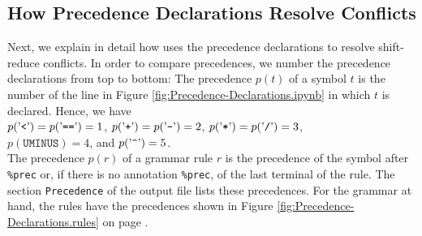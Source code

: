 \subsection{How Precedence Declarations Resolve Conflicts \label{section:resolving-with-precedences}}
Next, we explain in detail how  uses the precedence declarations to resolve shift-reduce
conflicts.  In order to compare precedences, we number the precedence declarations from top to bottom:  The
precedence $p(t)$ of a symbol $t$ is the number of the line in Figure \ref{fig:Precedence-Declarations.ipynb} in
which $t$ is declared.  Hence, we have
\\[0.2cm]
\hspace*{1.3cm}
$p(\mbox{'\texttt{<}'}) = p(\mbox{'\texttt{==}'}) = 1$, \quad $p(\mbox{'\texttt{+}'}) = p(\mbox{'\texttt{-}'}) = 2$, \quad
$p(\mbox{'\texttt{*}'}) = p(\mbox{'\texttt{/}'}) = 3$,
\\[0.2cm]
\hspace*{1.3cm}
$p(\texttt{UMINUS}) = 4$, \quad and \quad $p(\saquoted{\symbol{94}}) = 5$.
\\[0.2cm]
The precedence $p(r)$ of a grammar rule $r$ is the precedence of the symbol after \texttt{\%prec} or, if there is
no annotation \texttt{\%prec}, of the last terminal of the rule.  The section \texttt{Precedence} of the output file
lists these precedences.  For the grammar at hand, the rules have the precedences shown in Figure
\ref{fig:Precedence-Declarations.rules} on page \pageref{fig:Precedence-Declarations.rules}.

